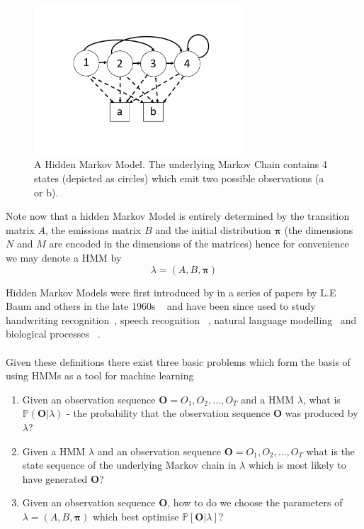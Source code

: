 \begin{figure}[]
  \centering
    \includegraphics[width=0.7\textwidth]{ThesisFigs/HMMExample}
  \caption{A Hidden Markov Model. The underlying Markov Chain contains 4 states (depicted as circles) which emit two possible observations (a or b).}\label{fig:hmmex}
\end{figure}


Note now that a hidden Markov Model is entirely determined by the transition matrix $A$, the emissions matrix $B$ and the initial distribution $\bm{\pi}$ (the dimensions $N$ and $M$ are encoded in the dimensions of the matrices) hence for convenience we may denote a HMM by
\begin{equation*}
\lambda = (A,B, \bm{\pi})
\end{equation*}

Hidden Markov Models were first introduced by in a series of papers by L.E Baum and others in the late 1960s ~\citep{baum1966statistical,baum1970maximization} and have been since used to study handwriting recognition~\citep{bunke1995off}, speech recognition ~\citep{juang1991hidden, jelinek1998statistical}, natural language modelling~\citep{manning1999foundations, jurafsky2002speech} and biological processes ~\citep{krogh1994hidden, durbin1998biological, lio1998models}.
\\
\\
Given these definitions there exist three basic problems which form the basis of using HMMs as a tool for machine learning
\begin{enumerate}
\item Given an observation sequence $\bm{O} = O_1,O_2,\dots,O_T$ and a HMM $\lambda$, what is $\mathbb{P}(\bm{O}|\lambda)$ - the probability that the observation sequence $\bm{O}$ was produced by $\lambda$?
\item Given a HMM $\lambda$ and an observation sequence $\bm{O} = O_1,O_2,\dots,O_T $ what is the state sequence of the underlying Markov chain in $\lambda$ which is most likely to have generated $\bm{O}$?
\item Given an observation sequence $\bm{O}$, how to do we choose the parameters of $\lambda = (A,B,\bm{\pi})$ which best optimise $\mathbb{P}[\bm{O}|\lambda]$?
\end{enumerate}


